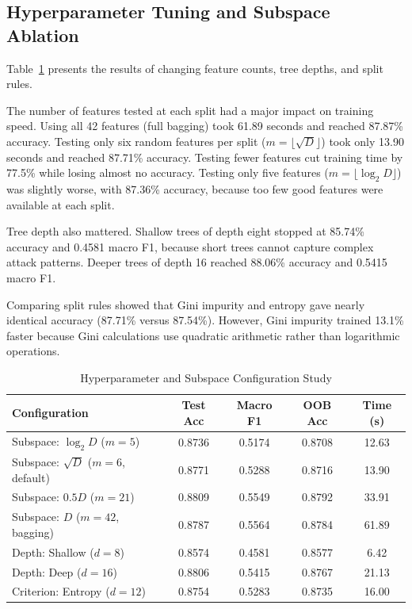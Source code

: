 \documentclass[conference,10pt]{IEEEtran}
\begin{document}
\subsection{Hyperparameter Tuning and Subspace Ablation}

Table~\ref{tab:hyperparameter_study} presents the results of changing feature counts, tree depths, and split rules.

The number of features tested at each split had a major impact on training speed. Using all 42 features (full bagging) took 61.89 seconds and reached 87.87\% accuracy. Testing only six random features per split ($m = \lfloor \sqrt{D} \rfloor$) took only 13.90 seconds and reached 87.71\% accuracy. Testing fewer features cut training time by 77.5\% while losing almost no accuracy. Testing only five features ($m = \lfloor \log_2 D \rfloor$) was slightly worse, with 87.36\% accuracy, because too few good features were available at each split.

Tree depth also mattered. Shallow trees of depth eight stopped at 85.74\% accuracy and 0.4581 macro F1, because short trees cannot capture complex attack patterns. Deeper trees of depth 16 reached 88.06\% accuracy and 0.5415 macro F1.

Comparing split rules showed that Gini impurity and entropy gave nearly identical accuracy (87.71\% versus 87.54\%). However, Gini impurity trained 13.1\% faster because Gini calculations use quadratic arithmetic rather than logarithmic operations.

\begin{table}[t]
\centering
\caption{Hyperparameter and Subspace Configuration Study}
\label{tab:hyperparameter_study}
\setlength{\tabcolsep}{1.8pt}
\footnotesize
\begin{tabular}{lcccc}
\toprule
Configuration & Test Acc & Macro F1 & OOB Acc & Time (s) \\
\midrule
Subspace: $\log_2 D$ ($m=5$) & 0.8736 & 0.5174 & 0.8708 & 12.63 \\
Subspace: $\sqrt{D}$ ($m=6$, default) & 0.8771 & 0.5288 & 0.8716 & 13.90 \\
Subspace: $0.5 D$ ($m=21$) & 0.8809 & 0.5549 & 0.8792 & 33.91 \\
Subspace: $D$ ($m=42$, bagging) & 0.8787 & 0.5564 & 0.8784 & 61.89 \\
Depth: Shallow ($d=8$) & 0.8574 & 0.4581 & 0.8577 & 6.42 \\
Depth: Deep ($d=16$) & 0.8806 & 0.5415 & 0.8767 & 21.13 \\
Criterion: Entropy ($d=12$) & 0.8754 & 0.5283 & 0.8735 & 16.00 \\
\bottomrule
\end{tabular}
\end{table}
\end{document}
